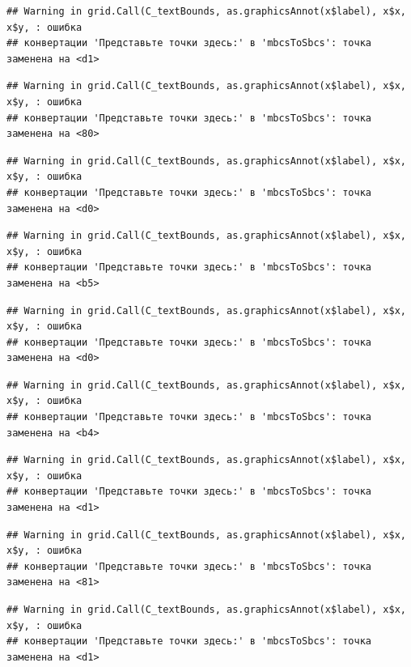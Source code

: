\documentclass[]{book}
\begin{document}
\begin{verbatim}
## Warning in grid.Call(C_textBounds, as.graphicsAnnot(x$label), x$x, x$y, : ошибка
## конвертации 'Представьте точки здесь:' в 'mbcsToSbcs': точка заменена на <d1>
\end{verbatim}

\begin{verbatim}
## Warning in grid.Call(C_textBounds, as.graphicsAnnot(x$label), x$x, x$y, : ошибка
## конвертации 'Представьте точки здесь:' в 'mbcsToSbcs': точка заменена на <80>
\end{verbatim}

\begin{verbatim}
## Warning in grid.Call(C_textBounds, as.graphicsAnnot(x$label), x$x, x$y, : ошибка
## конвертации 'Представьте точки здесь:' в 'mbcsToSbcs': точка заменена на <d0>
\end{verbatim}

\begin{verbatim}
## Warning in grid.Call(C_textBounds, as.graphicsAnnot(x$label), x$x, x$y, : ошибка
## конвертации 'Представьте точки здесь:' в 'mbcsToSbcs': точка заменена на <b5>
\end{verbatim}

\begin{verbatim}
## Warning in grid.Call(C_textBounds, as.graphicsAnnot(x$label), x$x, x$y, : ошибка
## конвертации 'Представьте точки здесь:' в 'mbcsToSbcs': точка заменена на <d0>
\end{verbatim}

\begin{verbatim}
## Warning in grid.Call(C_textBounds, as.graphicsAnnot(x$label), x$x, x$y, : ошибка
## конвертации 'Представьте точки здесь:' в 'mbcsToSbcs': точка заменена на <b4>
\end{verbatim}

\begin{verbatim}
## Warning in grid.Call(C_textBounds, as.graphicsAnnot(x$label), x$x, x$y, : ошибка
## конвертации 'Представьте точки здесь:' в 'mbcsToSbcs': точка заменена на <d1>
\end{verbatim}

\begin{verbatim}
## Warning in grid.Call(C_textBounds, as.graphicsAnnot(x$label), x$x, x$y, : ошибка
## конвертации 'Представьте точки здесь:' в 'mbcsToSbcs': точка заменена на <81>
\end{verbatim}

\begin{verbatim}
## Warning in grid.Call(C_textBounds, as.graphicsAnnot(x$label), x$x, x$y, : ошибка
## конвертации 'Представьте точки здесь:' в 'mbcsToSbcs': точка заменена на <d1>
\end{verbatim}
\end{document}
